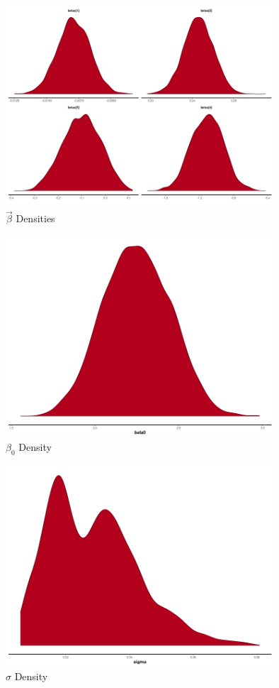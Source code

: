 \documentclass[11pt]{article}
\begin{document}
\begin{figure}[h!] 
	\centering
  \includegraphics[height=75mm]{density_betas.png}
  \caption{$\vec{\beta}$ Densities}
  \label{fig:dbetas}
\end{figure}

\begin{figure}[h!] 
	\centering
  \includegraphics[height=75mm]{density_beta0.png}
  \caption{$\beta_0$ Density}
  \label{fig:dbeta0}
\end{figure}

\begin{figure}[h!] 
	\centering
  \includegraphics[height=75mm]{density_sigma.png}
  \caption{$\sigma$ Density}
  \label{fig:dsigma}
\end{figure}
\end{document}
